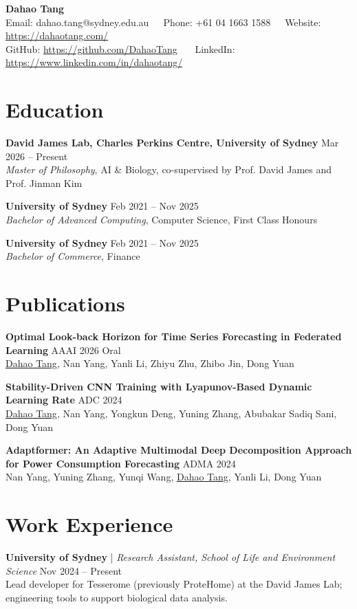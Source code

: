 \documentclass[10pt, a4paper]{article}
\makeatletter
\newcommand{\MyNameEN}{Dahao Tang}
\newcommand{\MyEmail}{dahao.tang@sydney.edu.au}
\newcommand{\MyPhone}{+61 04 1663 1588}
\newcommand{\MyWebsite}{https://dahaotang.com/}
\newcommand{\MyGitHub}{https://github.com/DahaoTang}
\newcommand{\MyLinkedIn}{https://www.linkedin.com/in/dahaotang/}
\newcommand{\EducationEntry}[4]{
  \noindent \textbf{#1} \hfill #2 \\
  \textit{#3}, #4 \par
  \vspace{4pt}
}
\newcommand{\PublicationEntry}[3]{
  \noindent \textbf{#1} \hfill #2 \\
  {\small #3} \par
  \vspace{4pt}
}
\newcommand{\ExperienceEntry}[4]{
  \noindent \textbf{#1} | \textit{#3} \hfill #2 \\
  {\small #4} \par
  \vspace{4pt}
}
\makeatother
\begin{document}
\begin{center}
  {\Huge \textbf{\MyNameEN}} \\ \vspace{5pt}
  \small
  Email: \MyEmail \ \textbullet \ \ 
  Phone: \MyPhone \ \textbullet \ \ 
  Website: \href{\MyWebsite}{\MyWebsite} \\
  GitHub: \href{\MyGitHub}{\MyGitHub} \ \textbullet \ \  
  LinkedIn: \href{\MyLinkedIn}{\MyLinkedIn}
\end{center}

\vspace{-5pt}

\section{Education}

\EducationEntry{David James Lab, Charles Perkins Centre, University of Sydney}{Mar 2026 -- Present}
{Master of Philosophy}{AI \& Biology, co-supervised by Prof. David James and Prof. Jinman Kim}

\EducationEntry{University of Sydney}{Feb 2021 -- Nov 2025}
{Bachelor of Advanced Computing}{Computer Science, First Class Honours}

\EducationEntry{University of Sydney}{Feb 2021 -- Nov 2025}
{Bachelor of Commerce}{Finance}

\section{Publications}
\PublicationEntry{Optimal Look-back Horizon for Time Series Forecasting in Federated Learning}{AAAI 2026 Oral}
{\underline{Dahao Tang}, Nan Yang, Yanli Li, Zhiyu Zhu, Zhibo Jin, Dong Yuan}

\PublicationEntry{Stability-Driven CNN Training with Lyapunov-Based Dynamic Learning Rate}{ADC 2024}
{\underline{Dahao Tang}, Nan Yang, Yongkun Deng, Yuning Zhang, Abubakar Sadiq Sani, Dong Yuan}

\PublicationEntry{Adaptformer: An Adaptive Multimodal Deep Decomposition Approach for Power Consumption Forecasting}{ADMA 2024}
{Nan Yang, Yuning Zhang, Yunqi Wang, \underline{Dahao Tang}, Yanli Li, Dong Yuan}

\section{Work Experience}
\ExperienceEntry{University of Sydney}{Nov 2024 -- Present}
{Research Assistant, School of Life and Environment Science}
{Lead developer for Tesserome (previously ProteHome) at the David James Lab; engineering tools to support biological data analysis.}
\end{document}
